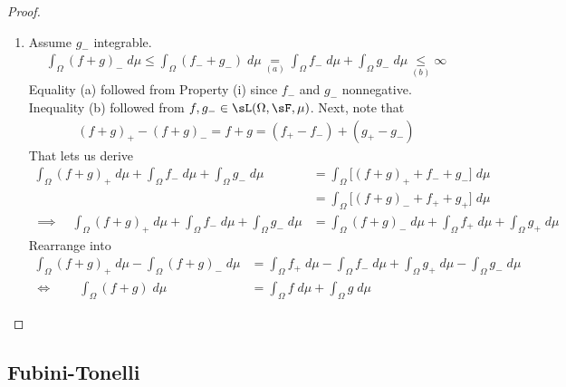 \documentclass[12pt]{article}
\theoremstyle{plain}
\theoremstyle{definition}
\theoremstyle{remark}
\begin{document}
\begin{proof}
\begin{enumerate}[label=(\roman*)]
  \item Assume $g_-$ integrable.
    \begin{align*}
      \int_\Omega (f+g)_-\;d\mu
      \leq
      \int_\Omega (f_- +g_-)\;d\mu
      \underset{(a)}{=}
      \int_\Omega f_- \;d\mu
      + \int_\Omega g_-\;d\mu
      \underset{(b)}{\leq}
      \infty
    \end{align*}
    Equality (a) followed from Property (i) since $f_-$ and $g_-$
    nonnegative. Inequality (b) followed from
    $f,g_-\in\sL(\Omega,\sF,\mu)$.
    Next, note that
    \begin{align*}
      (f+g)_+ - (f+g)_-
      = f+g = (f_+ - f_-) + (g_+ - g_-)
    \end{align*}
    That lets us derive
    \begin{align*}
      \int_\Omega (f+g)_+\;d\mu
      + \int_\Omega f_-\;d\mu
      + \int_\Omega g_-\;d\mu
      &= \int_\Omega \big[(f+g)_+ + f_- + g_-\big] \;d\mu \\
      &= \int_\Omega \big[(f+g)_- + f_+ + g_+\big] \;d\mu \\
      \implies\quad
      \int_\Omega (f+g)_+\;d\mu
      + \int_\Omega f_-\;d\mu
      + \int_\Omega g_-\;d\mu
      &=
      \int_\Omega (f+g)_-\;d\mu
      + \int_\Omega f_+\;d\mu
      + \int_\Omega g_+\;d\mu
    \end{align*}
    Rearrange into
    \begin{align*}
      \int_\Omega (f+g)_+\;d\mu
      - \int_\Omega (f+g)_-\;d\mu
      &=
      \int_\Omega f_+\;d\mu
      - \int_\Omega f_-\;d\mu
      + \int_\Omega g_+\;d\mu
      - \int_\Omega g_-\;d\mu
      \\
      \iff\qquad
      \int_\Omega (f+g)\;d\mu
      &=
      \int_\Omega f\;d\mu
      + \int_\Omega g\;d\mu
    \end{align*}
\end{enumerate}
\end{proof}


\clearpage
\subsection{Fubini-Tonelli}
\end{document}
